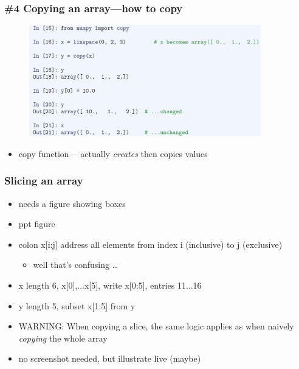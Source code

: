 \documentclass[14pt]{beamer}
\begin{document}
\begin{frame}[fragile]

\frametitle{\#4 Copying an array---how to copy}

\begin{figure}[ht]
	\centering
	\includegraphics[width=0.9\textwidth]{figures/LLp51a}
\end{figure}

\vspace*{-5mm}

\begin{itemize}
	\item copy function--- actually \emph{creates} then copies values
\end{itemize}

\end{frame}


\begin{frame}[fragile]

\frametitle{Slicing an array}

\begin{itemize}
	\item needs a figure showing boxes
	\item ppt figure
	\item colon x[i:j] address all elements from index i (inclusive) to j (exclusive)
		\begin{itemize}
			\item well that's confusing \ldots
		\end{itemize}
	\item x length 6, x[0],...x[5], write x[0:5], entries 11...16
	\item y length 5, subset x[1:5]  from y
	\item WARNING: When copying a slice, the same logic applies as when naively \emph{copying} the whole array
	\item no screenshot needed, but illustrate live (maybe)
\end{itemize}

\end{frame}
\end{document}
